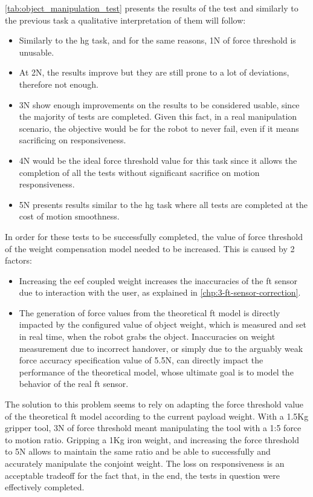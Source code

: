 \par \autoref{tab:object_manipulation_test} presents the results of the test and similarly to the previous task a qualitative interpretation of them will follow: 
\begin{itemize}
    \item Similarly to the \ac{hg} task, and for the same reasons, 1N of force threshold is unusable.
    \item At 2N, the results improve but they are still prone to a lot of deviations, therefore not enough.
    \item 3N show enough improvements on the results to be considered usable, since the majority of tests are completed. Given this fact, in a real manipulation scenario, the objective would be for the robot to never fail, even if it means sacrificing on responsiveness.
    \item 4N would be the ideal force threshold value for this task since it allows the completion of all the tests without significant sacrifice on motion responsiveness.
    \item 5N presents results similar to the \ac{hg} task where all tests are completed at the cost of motion smoothness.
\end{itemize}

\par In order for these tests to be successfully completed, the value of force threshold of the weight compensation model needed to be increased. This is caused by 2 factors: 

\begin{itemize}
    \item Increasing the \ac{eef} coupled weight increases the inaccuracies of the \ac{ft} sensor due to interaction with the user, as explained in \autoref{chp:3-ft-sensor-correction}.
    \item The generation of force values from the theoretical \ac{ft} model is directly impacted by the configured value of object weight, which is measured and set in real time, when the robot grabs the object. Inaccuracies on weight measurement due to incorrect handover, or simply due to the arguably weak force accuracy specification value of 5.5N, can directly impact the performance of the theoretical model, whose ultimate goal is to model the behavior of the real \ac{ft} sensor.
\end{itemize}

\par The solution to this problem seems to rely on adapting the force threshold value of the theoretical \ac{ft} model according to the current payload weight. With a 1.5Kg gripper tool, 3N of force threshold meant manipulating the tool with a 1:5 force to motion ratio. Gripping a 1Kg iron weight, and increasing the force threshold to 5N allows to maintain the same ratio and be able to successfully and accurately manipulate the conjoint weight. The loss on responsiveness is an acceptable tradeoff for the fact that, in the end, the tests in question were effectively completed. 

